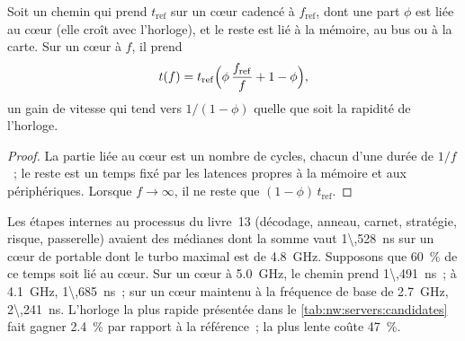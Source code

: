\begin{proposition}\label{prop:nw:servers:clock}
Soit un chemin qui prend $t_{\mathrm{ref}}$ sur un cœur cadencé à $f_{\mathrm{ref}}$, dont une part $\phi$ est liée au cœur (elle croît
avec l'horloge), et le reste est lié à la mémoire, au bus ou à la carte. Sur un cœur à $f$, il prend
\[
  t(f) = t_{\mathrm{ref}}\Bigl(\phi\,\frac{f_{\mathrm{ref}}}{f} + 1 - \phi\Bigr),
\]
un gain de vitesse qui tend vers $1/(1-\phi)$ quelle que soit la rapidité de l'horloge.
\end{proposition}

\begin{proof}
La partie liée au cœur est un nombre de cycles, chacun d'une durée de $1/f$~; le reste est un temps fixé par les latences
propres à la mémoire et aux périphériques. Lorsque $f \to \infty$, il ne reste que $(1-\phi)\,t_{\mathrm{ref}}$.
\end{proof}

\begin{example}\label{ex:nw:servers:book13}
Les étapes internes au processus du livre~13 (décodage, anneau, carnet, stratégie, risque, passerelle) avaient des médianes dont la somme vaut
\qty{1\,528}{\nano\second} sur un cœur de portable dont le turbo maximal est de 4.8~GHz. Supposons que 60~\% de ce temps soit lié au cœur. Sur un cœur à
5.0~GHz, le chemin prend \qty{1\,491}{\nano\second}~; à 4.1~GHz, \qty{1\,685}{\nano\second}~; sur un cœur maintenu à la fréquence de base de 2.7~GHz,
\qty{2\,241}{\nano\second}. L'horloge la plus rapide présentée dans le \cref{tab:nw:servers:candidates} fait gagner 2.4~\% par rapport à la référence~; la plus lente coûte 47~\%.
\end{example}

